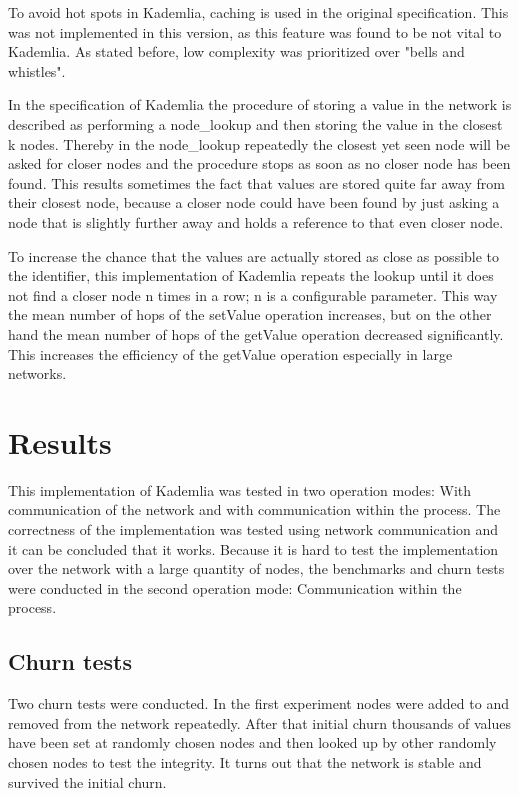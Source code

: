 \documentclass[a4paper, 12pt]{article} %
\begin{document}
To avoid hot spots in Kademlia, caching is used in the original specification. This was not implemented in this version, as this feature was found to be not vital to Kademlia. As stated before, low complexity was prioritized over "bells and whistles".

In the specification of Kademlia the procedure of storing a value in the network is described as performing a node\_lookup and then storing the value in the closest k nodes. Thereby in the node\_lookup repeatedly the closest yet seen node will be asked for closer nodes and the procedure stops as soon as no closer node has been found. This results sometimes the fact that values are stored quite far away from their closest node, because a closer node could have been found by just asking a node that is slightly further away and holds a reference to that even closer node. 

To increase the chance that the values are actually stored as close as possible to the identifier, this implementation of Kademlia repeats the lookup until it does not find a closer node n times in a row; n is a configurable parameter. This way the mean number of hops of the setValue operation increases, but on the other hand the mean number of hops of the getValue operation decreased significantly. This increases the efficiency of the getValue operation especially in large networks.

\newpage
\section{Results}

This implementation of Kademlia was tested in two operation modes: With communication of the network and with communication within the process. The correctness of the implementation was tested using network communication and it can be concluded that it works. Because it is hard to test the implementation over the network with a large quantity of nodes, the benchmarks and churn tests were conducted in the second operation mode: Communication within the process.

\subsection{Churn tests}

Two churn tests were conducted. In the first experiment nodes were added to and removed from the network repeatedly. After that initial churn thousands of values have been set at randomly chosen nodes and then looked up by other randomly chosen nodes to test the integrity. It turns out that the network is stable and survived the initial churn.
\end{document}
